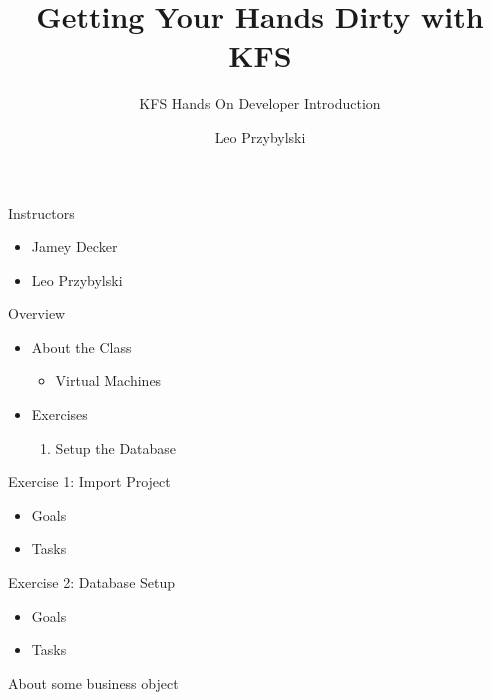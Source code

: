 \documentclass[xcolor=dvipsnames,14pt]{beamer}
\begin{document}
\title[A short proof]{Getting Your Hands Dirty with KFS}
\subtitle[Errors]{KFS Hands On Developer Introduction}
\author[Leo]{Leo Przybylski}



\begin{frame}[plain]
  \titlepage
\end{frame}

\begin{frame}{Instructors}
	\begin{itemize}
		\item Jamey Decker
		\item Leo Przybylski
	\end{itemize}
\end{frame}

\begin{frame}{Overview}
	\begin{itemize}
		\item About the Class
		\begin{itemize}
			\item Virtual Machines
		\end{itemize}
		\item Exercises
			\begin{enumerate}
				\item Setup the Database
			\end{enumerate}
	\end{itemize}
\end{frame}

\begin{frame}{Exercise 1: Import Project}
	\begin{itemize}
		\item Goals
		\item Tasks
	\end{itemize}
\end{frame}

\begin{frame}{Exercise 2: Database Setup}
	\begin{itemize}
		\item Goals
		\item Tasks
	\end{itemize}
\end{frame}

\begin{frame}{About some business object}
\end{frame}
\end{document}
